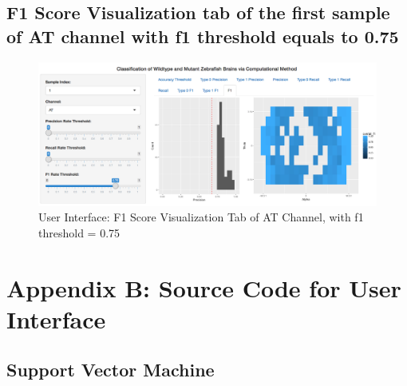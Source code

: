 \documentclass[10pt,letterpaper]{article}
\begin{document}
\subsection{F1 Score Visualization tab of the first sample of AT channel
with f1 threshold equals to
0.75}\label{f1-score-visualization-tab-of-the-first-sample-of-at-channel-with-f1-threshold-equals-to-0.75}

\begin{figure}[h]

{\centering \includegraphics[width=4.9in]{figures/shiny7} 

}

\caption{User Interface: F1 Score Visualization Tab of AT Channel, with f1 threshold = 0.75}\label{fig:shiny7}
\end{figure}

\newpage

\section{Appendix B: Source Code for User
Interface}\label{appendix-b-source-code-for-user-interface}

\subsection{Support Vector Machine}\label{support-vector-machine-2}
\end{document}
